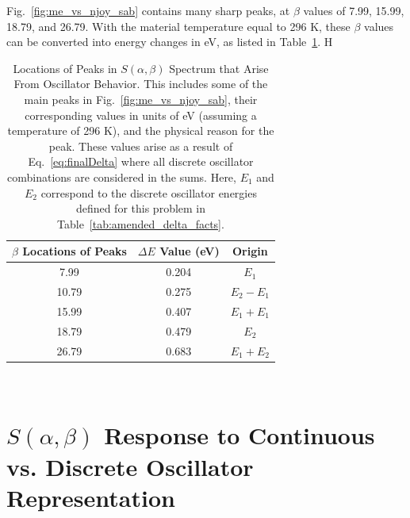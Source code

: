 \documentclass[Master.tex]{subfiles}
\begin{document}
    Fig.~\ref{fig:me_vs_njoy_sab} contains many sharp peaks, at $\beta$ values of 7.99, 15.99, 18.79, and 26.79. With the material temperature equal to 296 K, these $\beta$ values can be converted into energy changes in eV, as listed in Table~\ref{tab:spikeLocations}. H

  \begin{table}[h]
    \centering
    \caption[Locations of Peaks in $S(\alpha,\beta)$ Spectrum that Arise From Oscillator Behavior]{Locations of Peaks in $S(\alpha,\beta)$ Spectrum that Arise From Oscillator Behavior. This includes some of the main peaks in Fig.~\ref{fig:me_vs_njoy_sab}, their corresponding values in units of eV (assuming a temperature of 296 K), and the physical reason for the peak. These values arise as a result of Eq.~\ref{eq:finalDelta} where all discrete oscillator combinations are considered in the sums. Here, $E_1$ and $E_2$ correspond to the discrete oscillator energies defined for this problem in Table~\ref{tab:amended_delta_facts}.}
    \label{tab:spikeLocations}
    \begin{tabular}{ |c|c|c| }\hline
      $\beta$ Locations of Peaks& $\Delta E$ Value (eV) & Origin \\\hline
      7.99  & 0.204 & $E_1$ \\\hline
      10.79 & 0.275 & $E_2-E_1$ \\\hline
      15.99 & 0.407 & $E_1+E_1$ \\\hline
      18.79 & 0.479 & $E_2$ \\\hline
      26.79 & 0.683 & $E_1+E_2$ \\\hline
    \end{tabular}\\[1ex]
  \end{table}








\section{$S(\alpha,\beta)$ Response to Continuous vs. Discrete Oscillator Representation} 
\end{document}

